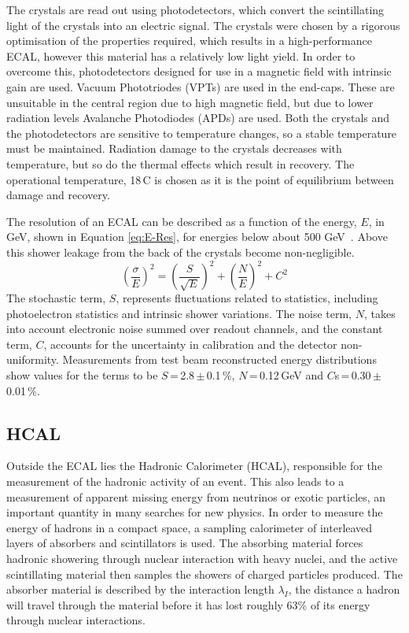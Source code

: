 The crystals are read out using photodetectors, which convert the scintillating light of the crystals into an electric signal. The crystals were chosen by a rigorous optimisation of the properties required, which results in a high-performance ECAL, however this material has a relatively low light yield. In order to overcome this, photodetectors designed for use in a magnetic field with intrinsic gain are used. Vacuum Phototriodes  (VPTs) are used in the end-caps. These are unsuitable in the central region due to high magnetic field, but due to lower radiation levels Avalanche Photodiodes (APDs) are used. Both the crystals and the photodetectors are sensitive to temperature changes, so a stable temperature must be maintained. Radiation damage to the crystals decreases with temperature, but so do the thermal effects which result in recovery. The operational temperature, 18\,\textdegree C is chosen as it is the point of equilibrium between damage and recovery.


The resolution of an ECAL can be described as a function of the energy, $E$, in GeV, shown in Equation \ref{eq:E-Res}, for energies below about 500 GeV~\cite{PDG}. Above this shower leakage from the back of the crystals become non-negligible. 
\begin{equation}
\left(\frac{\sigma}{E}\right)^2 = \left(\frac{S}{\sqrt{E}}\right)^2 + \left(\frac{N}{E}\right)^2 + C^2
\label{eq:E-Res}
\end{equation}
The stochastic term, $S$, represents fluctuations related to statistics, including photoelectron statistics and intrinsic shower variations. The noise term, $N$, takes into account electronic noise summed over readout channels, and the constant term, $C$, accounts for the uncertainty in calibration and the detector non-uniformity. Measurements from test beam reconstructed energy distributions show values for the terms to be $S$\,=\,2.8\,$\pm$\,0.1\,\%, $N$\,=\,0.12\,GeV and $C$s\,=\,0.30\,$\pm$\,0.01\,\%. 


\subsection{HCAL}

Outside the ECAL lies the Hadronic Calorimeter (HCAL),  responsible for the measurement of the hadronic activity of an event. This also leads to a measurement of apparent missing energy from neutrinos or exotic particles, an important quantity in many searches for new physics. In order to measure the energy of hadrons in a compact space, a sampling calorimeter of interleaved layers of absorbers and scintillators is used. The absorbing material forces hadronic showering through nuclear interaction with heavy nuclei, and the active scintillating material then samples the showers of charged particles produced. The absorber material is described by the interaction length $\lambda_{I}$, the distance a hadron will travel through the material before it has lost roughly 63\% of its energy through nuclear interactions.

